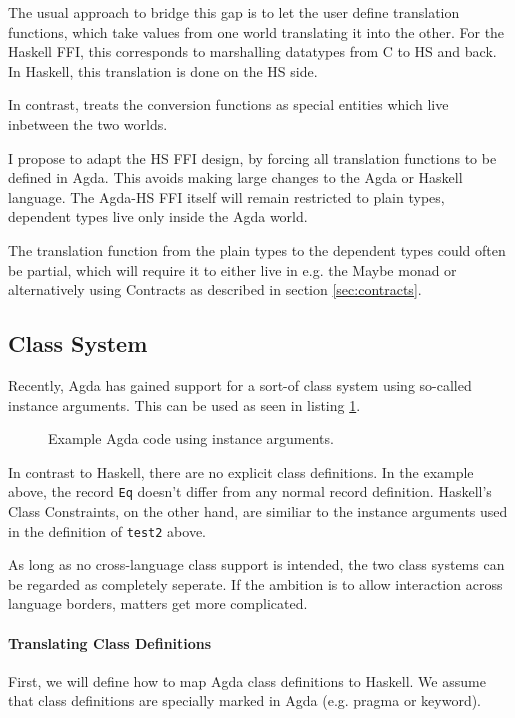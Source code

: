 \documentclass[12pt, a4paper, twoside]{report}
\begin{document}
The usual approach to bridge this gap is to let the user define translation functions, which take
values from one world translating it into the other. For the Haskell FFI, this corresponds to marshalling
datatypes from C to HS and back. In Haskell, this translation is done on the HS side.

In contrast, \cite{Osera:2012:DI:2103776.2103779} treats the conversion functions as special entities
which live inbetween the two worlds.


I propose to adapt the HS FFI design, by forcing all translation functions to be defined in Agda.
This avoids making large changes to the Agda or Haskell language. The Agda-HS FFI itself will remain
restricted to plain types, dependent types live only inside the Agda world.

The translation function from the plain types to the dependent types could often be partial,
which will require it to either live in e.g. the Maybe monad or alternatively using Contracts as described in section \ref{sec:contracts}.

\subsection{Class System}
Recently, Agda has gained support for a sort-of class system using so-called instance arguments. This can
be used as seen in listing \ref{lst:agda-inst-ex}.
\begin{figure}

\caption{Example Agda code using instance arguments.}
\label{lst:agda-inst-ex}
\end{figure}

In contrast to Haskell, there are no explicit class definitions. In the example above,
the record \texttt{Eq} doesn't differ from any normal record definition.
Haskell's Class Constraints, on the other hand, are similiar to the instance
arguments used in the definition of \texttt{test2} above.

As long as no cross-language class support is intended, the two class systems can be
regarded as completely seperate. If the ambition is to allow interaction across
language borders, matters get more complicated.

\paragraph{Translating Class Definitions}
First, we will define how to map Agda class definitions to Haskell. We assume
that class definitions are specially marked in Agda (e.g. pragma or keyword).
\end{document}
